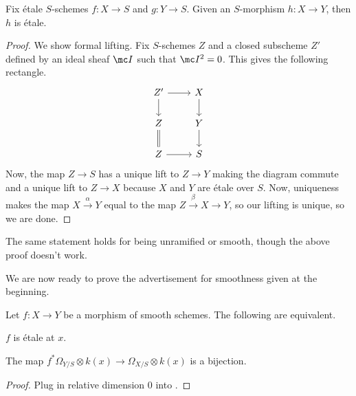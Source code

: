 \documentclass[../notes.tex]{subfiles}
\begin{document}
\begin{lemma} \label{lem:etale-cancellation}
	Fix \'etale $S$-schemes $f\colon X\to S$ and $g\colon Y\to S$. Given an $S$-morphism $h\colon X\to Y$, then $h$ is \'etale.
\end{lemma}
\begin{proof}
	We show formal lifting. Fix $S$-schemes $Z$ and a closed subscheme $Z'$ defined by an ideal sheaf $\mc I$ such that $\mc I^2=0$. This gives the following rectangle.
	\[\begin{tikzcd}
		{Z'} & X \\
		Z & Y \\
		Z & S
		\arrow[from=3-1, to=3-2]
		\arrow[Rightarrow, no head, from=2-1, to=3-1]
		\arrow[from=1-1, to=2-1]
		\arrow[from=1-1, to=1-2]
		\arrow[from=1-2, to=2-2]
		\arrow[from=2-2, to=3-2]
	\end{tikzcd}\]
	Now, the map $Z\to S$ has a unique lift to $Z\to Y$ making the diagram commute and a unique lift to $Z\to X$ because $X$ and $Y$ are \'etale over $S$. Now, uniqueness makes the map $X\stackrel\alpha\to Y$ equal to the map $Z\stackrel\beta\to X\to Y$, so our lifting is unique, so we are done.
\end{proof}
\begin{remark}
	The same statement holds for being unramified or smooth, though the above proof doesn't work.
\end{remark}
We are now ready to prove the advertisement for smoothness given at the beginning.
\begin{corollary} \label{cor:etale-via-fibers}
	Let $f\colon X\to Y$ be a morphism of smooth schemes. The following are equivalent.
	\begin{listalph}
		\item $f$ is \'etale at $x$.
		\item The map $f^*\Omega_{Y/S}\otimes k(x)\to\Omega_{X/S}\otimes k(x)$ is a bijection.
	\end{listalph}
\end{corollary}
\begin{proof}
	Plug in relative dimension $0$ into .
\end{proof}
\end{document}
